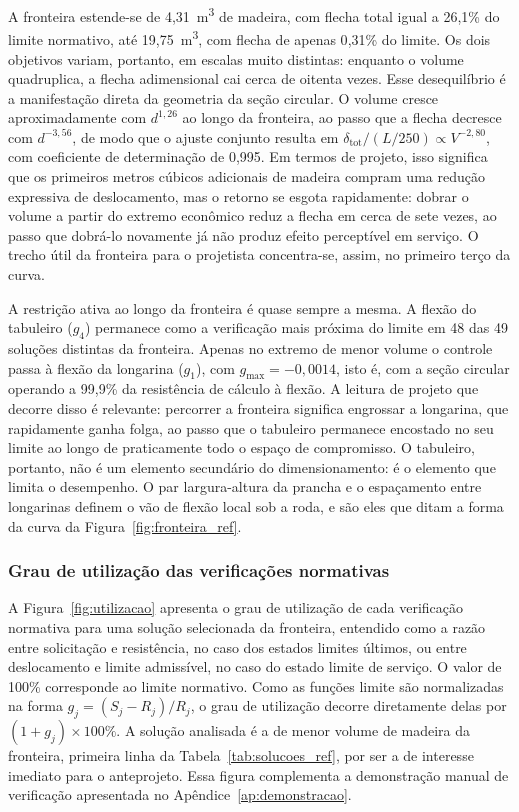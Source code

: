 A fronteira estende-se de 4{,}31~m\textsuperscript{3} de madeira, com flecha total igual a 26{,}1\% do limite normativo, até 19{,}75~m\textsuperscript{3}, com flecha de apenas 0{,}31\% do limite.
Os dois objetivos variam, portanto, em escalas muito distintas: enquanto o volume quadruplica, a flecha adimensional cai cerca de oitenta vezes.
Esse desequilíbrio é a manifestação direta da geometria da seção circular.
O volume cresce aproximadamente com $d^{1{,}26}$ ao longo da fronteira, ao passo que a flecha decresce com $d^{-3{,}56}$, de modo que o ajuste conjunto resulta em $\delta_{\mathrm{tot}}/(L/250) \propto V^{-2{,}80}$, com coeficiente de determinação de 0{,}995.
Em termos de projeto, isso significa que os primeiros metros cúbicos adicionais de madeira compram uma redução expressiva de deslocamento, mas o retorno se esgota rapidamente: dobrar o volume a partir do extremo econômico reduz a flecha em cerca de sete vezes, ao passo que dobrá-lo novamente já não produz efeito perceptível em serviço.
O trecho útil da fronteira para o projetista concentra-se, assim, no primeiro terço da curva.

A restrição ativa ao longo da fronteira é quase sempre a mesma.
A flexão do tabuleiro ($g_4$) permanece como a verificação mais próxima do limite em 48 das 49 soluções distintas da fronteira. Apenas no extremo de menor volume o controle passa à flexão da longarina ($g_1$), com $g_{\max} = -0{,}0014$, isto é, com a seção circular operando a 99{,}9\% da resistência de cálculo à flexão.
A leitura de projeto que decorre disso é relevante: percorrer a fronteira significa engrossar a longarina, que rapidamente ganha folga, ao passo que o tabuleiro permanece encostado no seu limite ao longo de praticamente todo o espaço de compromisso.
O tabuleiro, portanto, não é um elemento secundário do dimensionamento: é o elemento que limita o desempenho. O par largura-altura da prancha e o espaçamento entre longarinas definem o vão de flexão local sob a roda, e são eles que ditam a forma da curva da Figura~\ref{fig:fronteira_ref}.

\subsubsection{Grau de utilização das verificações normativas}\label{sec:utilizacao}

A Figura~\ref{fig:utilizacao} apresenta o grau de utilização de cada verificação normativa para uma solução selecionada da fronteira, entendido como a razão entre solicitação e resistência, no caso dos estados limites últimos, ou entre deslocamento e limite admissível, no caso do estado limite de serviço.
O valor de 100\% corresponde ao limite normativo.
Como as funções limite são normalizadas na forma $g_j = (S_j - R_j)/R_j$, o grau de utilização decorre diretamente delas por $(1 + g_j)\times 100\%$.
A solução analisada é a de menor volume de madeira da fronteira, primeira linha da Tabela~\ref{tab:solucoes_ref}, por ser a de interesse imediato para o anteprojeto.
Essa figura complementa a demonstração manual de verificação apresentada no Apêndice~\ref{ap:demonstracao}.

